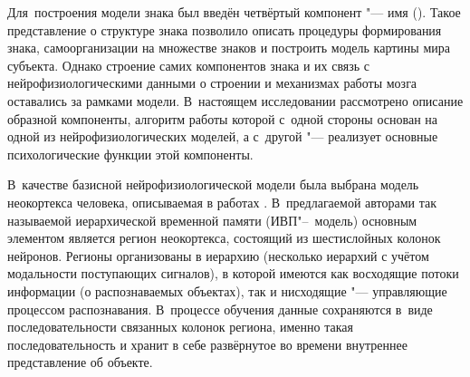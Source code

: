 \documentclass[a4paper, 12pt]{article}
\theoremstyle{plain}
\begin{document}
	Для~построения модели знака был введён четвёртый компонент "--- имя (\cite{Osipov2002b, PanovA2014a}). Такое представление о структуре знака позволило описать процедуры формирования знака, самоорганизации на множестве знаков и построить модель картины мира субъекта. Однако строение самих компонентов знака и их связь с нейрофизиологическими данными о строении и механизмах работы мозга оставались за рамками модели. В~настоящем исследовании рассмотрено описание образной компоненты, алгоритм работы которой с~одной стороны основан на одной из нейрофизиологических моделей, а с~другой "--- реализует основные психологические функции этой компоненты.
	
	В~качестве базисной нейрофизиологической модели была выбрана модель неокортекса человека, описываемая в работах \cite{Hawkins2009,George2005}. В~предлагаемой авторами так называемой иерархической временной памяти (ИВП"--~модель) основным элементом является регион неокортекса, состоящий из шестислойных колонок нейронов. Регионы организованы в иерархию (несколько иерархий с учётом модальности поступающих сигналов), в которой имеются как восходящие потоки информации (о распознаваемых объектах), так и нисходящие "--- управляющие процессом распознавания. В~процессе обучения данные сохраняются в~виде последовательности связанных колонок региона, именно такая последовательность и хранит в себе развёрнутое во времени внутреннее представление об объекте.
	
\end{document}
